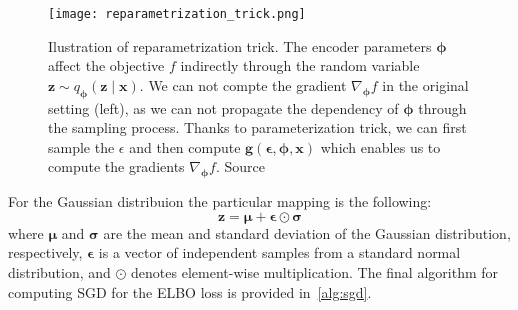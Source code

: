 \begin{figure}[t]
    \centering
    \texttt{[image: reparametrization\_trick.png]}
    \caption[Reparametrization trick]{Ilustration of reparametrization trick. The encoder parameters ${\boldsymbol{\phi}}$ affect the objective $f$ indirectly through the random variable $\mathbf{z} \sim  q_{\boldsymbol{\phi}}(\mathbf{z}\mid \mathbf{x})$.
    We can not compte the gradient $\nabla_{\boldsymbol{\phi}} f$ in the original setting (left), as we can not propagate the dependency of ${\boldsymbol{\phi}}$ through the sampling process. Thanks to parameterization trick, we 
    can first sample the $\epsilon$ and then compute $\mathbf{g}(\boldsymbol{\epsilon},{\boldsymbol{\phi}},\mathbf{x})$ which enables us to compute the gradients $\nabla_{\boldsymbol{\phi}} f$.
    Source~\cite{intro-vae-2019}}
    \label{fig:reparam_trick}
\end{figure}
For the Gaussian distribuion the particular mapping is the following:
$$
\mathbf{z} = \boldsymbol{\mu} + \boldsymbol{\epsilon} \odot \boldsymbol{\sigma}
$$
where $\boldsymbol{\mu}$ and $\boldsymbol{\sigma}$ are the mean and standard deviation of the Gaussian distribution, respectively, 
$\boldsymbol{\epsilon}$ is a vector of independent samples from a standard normal distribution, and $\odot$ denotes element-wise 
multiplication. The final algorithm for computing SGD for the ELBO loss is provided in~\ref{alg:sgd}.
